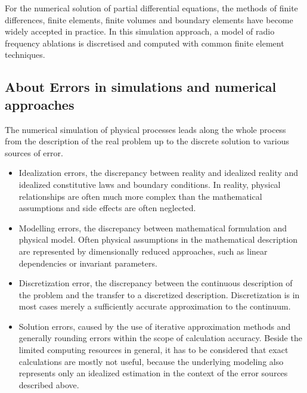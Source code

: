 \documentclass[parskip=half, titlepage=yes, 12pt, BCOR=12mm, DIV=calc]{scrartcl}
\begin{document}
For the numerical solution of partial differential equations, the methods of finite differences, finite elements, finite volumes and boundary elements have become widely accepted in practice.
In this simulation approach, a model of radio frequency ablations is discretised and computed with common finite element techniques. \\




\subsection{About Errors in simulations and numerical approaches}

The numerical simulation of physical processes leads along the whole process from the description of the real problem up to the discrete solution to various sources of error.

\begin{itemize}
    \item Idealization errors, the discrepancy between reality and idealized reality and idealized constitutive laws and boundary conditions. In reality, physical relationships are often much more complex than the mathematical assumptions and side effects are often neglected.
    
    \item Modelling errors, the discrepancy between mathematical formulation and physical model. Often physical assumptions in the mathematical description are represented by dimensionally reduced approaches, such as linear dependencies or invariant parameters.
    
    \item  Discretization error, the discrepancy between the continuous description of the problem and the transfer to a discretized description. Discretization is in most cases merely a sufficiently accurate approximation to the continuum.
    
    \item Solution errors, caused by the use of iterative approximation methods and generally rounding errors within the scope of calculation accuracy. Beside the limited computing resources in general, it has to be considered that exact calculations are mostly not useful, because the underlying modeling also represents only an idealized estimation in the context of the error sources described above.
    
\end{itemize}
\end{document}
